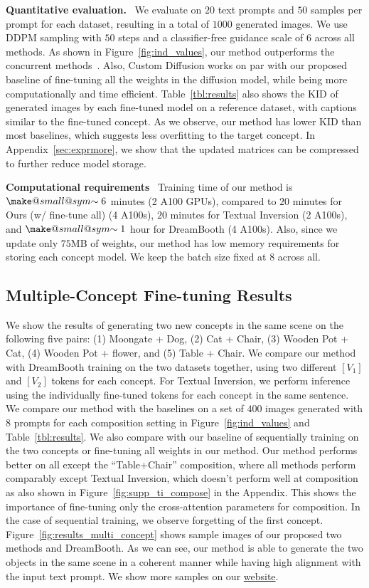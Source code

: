   \textbf{Quantitative evaluation.} \ 
We evaluate on $20$ text prompts and $50$ samples per prompt for each dataset, resulting in a total of $1000$ generated images. We use DDPM sampling with $50$ steps and a classifier-free guidance scale of $6$ across all methods. As shown in Figure~\ref{fig:ind_values}, our method outperforms the concurrent methods~\cite{ruiz2022dreambooth,gal2022image}. Also, Custom Diffusion works on par with our proposed baseline of fine-tuning all the weights in the diffusion model, while being more computationally and time efficient. Table~\ref{tbl:results} also shows the KID of generated images by each fine-tuned model on a reference dataset, with captions similar to the fine-tuned concept. As we observe, our method has lower KID than most baselines, which suggests less overfitting to the target concept. In Appendix~\ref{sec:exprmore}, we show that the updated matrices can be compressed to further reduce model storage.

  \textbf{Computational requirements} \ Training time of our method is $\mathrel{\mathpalette\make@small@sym{\sim}}6$ minutes (2 A100 GPUs), compared to $20$ minutes for Ours (w/ fine-tune all) (4 A100s), $20$ minutes for Textual Inversion (2 A100s), and $\mathrel{\mathpalette\make@small@sym{\sim}}1$ hour for DreamBooth (4 A100s). Also, since we update only $75$MB of weights, our method has low memory requirements for storing each concept model. We keep the batch size fixed at $8$ across all. 

\subsection{Multiple-Concept Fine-tuning Results}\label{sec:multiple_concept_expr}
We show the results of generating two new concepts in the same scene on the following five pairs: (1) Moongate + Dog, (2) Cat + Chair, (3) Wooden Pot + Cat, (4) Wooden Pot + flower, and (5) Table + Chair. We compare our method with DreamBooth training on the two datasets together, using two different $[V_1]$ and $[V_2]$ tokens for each concept. For Textual Inversion, we perform inference using the individually fine-tuned tokens for each concept in the same sentence. We compare our method with the baselines on a set of $400$ images generated with $8$ prompts for each composition setting in Figure~\ref{fig:ind_values} and Table~\ref{tbl:results}. We also compare with our baseline of sequentially training on the two concepts or fine-tuning all weights in our method. Our method performs better on all except the ``Table+Chair'' composition, where all methods perform comparably except Textual Inversion, which doesn't perform well at composition as also shown in Figure~\ref{fig:supp_ti_compose} in the Appendix. This shows the importance of fine-tuning only the cross-attention parameters for composition. In the case of sequential training, we observe forgetting of the first concept. Figure~\ref{fig:results_multi_concept} shows sample images of our proposed two methods and DreamBooth. As we can see, our method is able to generate the two objects in the same scene in a coherent manner while having high alignment with the input text prompt. We show more samples on our \href{https://www.cs.cmu.edu/~custom-diffusion/}{website}.

